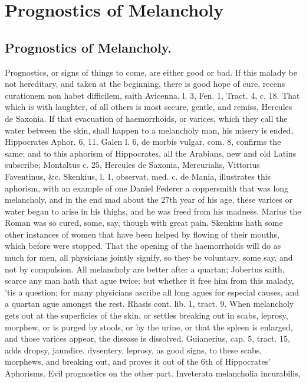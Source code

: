 \chapter{Prognostics of Melancholy}
\section{Prognostics of Melancholy.}

Prognostics, or signs of things to come, are either good or bad. If
this malady be not hereditary, and taken at the beginning, there is
good hope of cure, recens curationem non habet difficilem, saith
Avicenna, l. 3, Fen. 1, Tract. 4, c. 18. That which is with laughter,
of all others is most secure, gentle, and remiss, Hercules de Saxonia.
If that evacuation of haemorrhoids, or varices, which they call
the water between the skin, shall happen to a melancholy man, his
misery is ended, Hippocrates Aphor. 6, 11. Galen l. 6, de morbis
vulgar. com. 8, confirms the same; and to this aphorism of Hippocrates,
all the Arabians, new and old Latins subscribe; Montaltus c. 25,
Hercules de Saxonia, Mercurialis, Vittorius Faventinus, \&c. Skenkius,
l. 1, observat. med. c. de Mania, illustrates this aphorism, with an
example of one Daniel Federer a coppersmith that was long melancholy,
and in the end mad about the 27th year of his age, these varices or
water began to arise in his thighs, and he was freed from his madness.
Marius the Roman was so cured, some, say, though with great pain.
Skenkius hath some other instances of women that have been helped by
flowing of their mouths, which before were stopped. That the opening of
the haemorrhoids will do as much for men, all physicians jointly
signify, so they be voluntary, some say, and not by compulsion. All
melancholy are better after a quartan; Jobertus saith, scarce any
man hath that ague twice; but whether it free him from this malady,
'tis a question; for many physicians ascribe all long agues for
especial causes, and a quartan ague amongst the rest. Rhasis
cont. lib. 1, tract. 9. When melancholy gets out at the superficies of
the skin, or settles breaking out in scabs, leprosy, morphew, or is
purged by stools, or by the urine, or that the spleen is enlarged, and
those varices appear, the disease is dissolved. Guianerius, cap. 5,
tract. 15, adds dropsy, jaundice, dysentery, leprosy, as good signs, to
these scabs, morphews, and breaking out, and proves it out of the 6th
of Hippocrates' Aphorisms.
Evil prognostics on the other part. Inveterata melancholia incurabilis,
